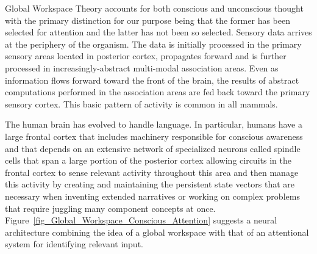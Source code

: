 Global Workspace Theory accounts for both conscious and unconscious thought with the primary distinction for our purpose being that the former has been selected for attention and the latter has not been so selected. Sensory data arrives at the periphery of the organism. The data is initially processed in the primary sensory areas located in posterior cortex, propagates forward and is further processed in increasingly-abstract multi-modal association areas. Even as information flows forward toward the front of the brain, the results of abstract computations performed in the association areas are fed back toward the primary sensory cortex. This basic pattern of activity is common in all mammals. 

The human brain has evolved to handle language. In particular, humans have a large frontal cortex that includes machinery responsible for conscious awareness and that depends on an extensive network of specialized neurons called spindle cells that span a large portion of the posterior cortex allowing circuits in the frontal cortex to sense relevant activity throughout this area and then manage this activity by creating and maintaining the persistent state vectors that are necessary when inventing extended narratives or working on complex problems that require juggling many component concepts at once. Figure~\ref{fig_Global_Workspace_Conscious_Attention} suggests a neural architecture combining the idea of a global workspace with that of an attentional system for identifying relevant input.


